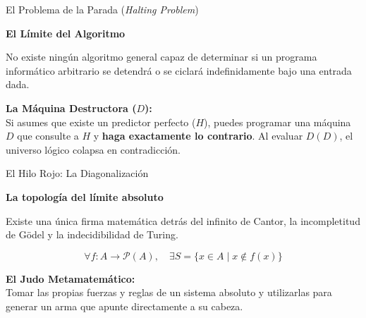 \documentclass[10pt, aspectratio=169]{beamer}
\begin{document}
\begin{frame}{El Problema de la Parada (\textit{Halting Problem})}
    \begin{center}
        \Large \textbf{El Límite del Algoritmo}
        
        \vspace{0.6cm}
        \normalsize
        No existe ningún algoritmo general capaz de determinar si un programa informático arbitrario se detendrá o se ciclará indefinidamente bajo una entrada dada.
    \end{center}
    
    \vspace{0.6cm}
    \alert{\textbf{La Máquina Destructora ($D$):}} \\
    Si asumes que existe un predictor perfecto ($H$), puedes programar una máquina $D$ que consulte a $H$ y \textbf{haga exactamente lo contrario}. Al evaluar $D(D)$, el universo lógico colapsa en contradicción.
\end{frame}


\begin{frame}{El Hilo Rojo: La Diagonalización}
    \begin{center}
        \Large \textbf{La topología del límite absoluto}
        
        \vspace{0.5cm}
        \normalsize
        Existe una única firma matemática detrás del infinito de Cantor, la incompletitud de Gödel y la indecidibilidad de Turing.
        
        \vspace{0.6cm}
        \huge
        $$\forall f: A \to \mathcal{P}(A), \quad \exists S = \{ x \in A \mid x \notin f(x) \}$$
    \end{center}
    
    \vspace{0.6cm}
    \normalsize
    \alert{\textbf{El Judo Metamatemático:}} \\
    Tomar las propias fuerzas y reglas de un sistema absoluto y utilizarlas para generar un arma que apunte directamente a su cabeza.
\end{frame}
\end{document}
